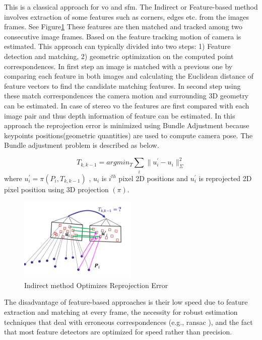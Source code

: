 This is a classical approach for \acrshort{vo} and \acrshort{sfm}. The Indirect or Feature-based method involves extraction of some features such as corners, edges etc. from the images frames. See Figure\ref{fig:feature} These features are then matched and tracked among two consecutive image frames. Based on the feature tracking motion of camera is estimated.  This approach can typically divided into two steps: 1) Feature detection and matching, 2) geometric optimization on the computed point correspondences. In first step an image is matched with a previous one by comparing each feature in both images and calculating the Euclidean distance of feature vectors to find the candidate matching features.\cite{Aqel-et-al-2016} In second step using these match correspondences the camera motion and surrounding 3D geometry can be estimated. In case of stereo \acrshort{vo} the features are first compared with each image pair and thus depth information of feature can be estimated. In this approach the reprojection error is minimized using Bundle Adjustment because keypoints positions(geometric quantities) are used to compute camera pose. The Bundle adjustment problem is described as below. 

\begin{equation*}
	T_{k,k-1} = arg min_{T} \sum_{i} \| u^{'}_{i}- u_{i}\|^{2}_{\Sigma}
\end{equation*}
where   $u^{'}_{i} = \pi (P_{i},T_{k,k-1})$ , $ u_{i} $ is $ i^{th} $  pixel 2D positions and $ u^{'}_{i} $ is reprojected 2D pixel position using 3D projection $(\pi)$.  

\begin{figure}[h]
	\centering
	\includegraphics[width=0.5\textwidth]{indirect}
	\caption{Indirect method Optimizes Reprojection Error}
	\label{fig:feature}
\end{figure}

The disadvantage of feature-based approaches is their low speed due to feature extraction and matching at every frame, the necessity for robust estimation techniques that deal with erroneous correspondences (e.g., \acrshort{ransac} ), and the fact that most feature detectors are optimized for speed rather than precision.\cite{7782863}

